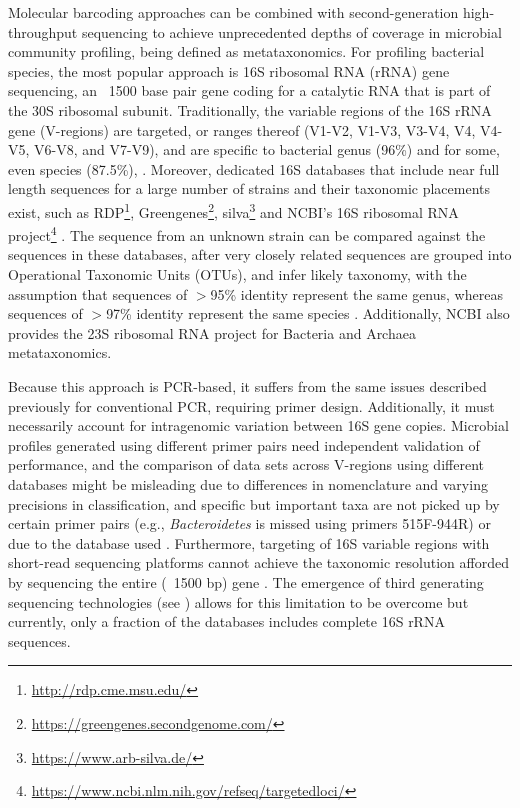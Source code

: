 Molecular barcoding approaches can be combined with second-generation high-throughput sequencing to achieve unprecedented depths of coverage in microbial community profiling, being defined as metataxonomics. For profiling bacterial species, the most popular approach is 16S ribosomal RNA (rRNA) gene sequencing, an ~1500 base pair gene coding for a catalytic RNA that is part of the 30S ribosomal subunit. Traditionally, the variable regions of the 16S rRNA gene (V-regions) are targeted, or ranges thereof (V1-V2, V1-V3, V3-V4, V4, V4-V5, V6-V8, and V7-V9), and are specific to bacterial genus (96\%) and for some, even species (87.5\%), \citep{srinivasan_use_2015, abellan-schneyder_primer_2021}. Moreover, dedicated 16S databases that include near full length sequences for a large number of strains and their taxonomic placements exist, such as RDP\footnote{\url{http://rdp.cme.msu.edu/}}, Greengenes\footnote{\url{https://greengenes.secondgenome.com/}}, silva\footnote{\url{https://www.arb-silva.de/}} and NCBI's 16S ribosomal RNA project\footnote{\url{https://www.ncbi.nlm.nih.gov/refseq/targetedloci/}} \citep{cole_ribosomal_2009, desantis_greengenes_2006, pruesse_silva_2007}. The sequence from an unknown strain can be compared against the sequences in these databases, after very closely related sequences are grouped into Operational Taxonomic Units (OTUs), and infer likely taxonomy, with the assumption that sequences of $>$95\% identity represent the same genus, whereas sequences of $>$97\% identity represent the same species \citep{schloss_introducing_2005}. Additionally, NCBI also provides the 23S ribosomal RNA project for Bacteria and Archaea metataxonomics. 

Because this approach is PCR-based, it suffers from the same issues described previously for conventional PCR, requiring primer design. Additionally, it must necessarily account for intragenomic variation between 16S gene copies. Microbial profiles generated using different primer pairs need independent validation of performance, and the comparison of data sets across V-regions using different databases might be misleading due to differences in nomenclature and varying precisions in classification, and specific but important taxa are not picked up by certain primer pairs (e.g., \textit{Bacteroidetes} is missed using primers 515F-944R) or due to the database used \citep{abellan-schneyder_primer_2021}. Furthermore, targeting of 16S variable regions with short-read sequencing platforms cannot achieve the taxonomic resolution afforded by sequencing the entire (~1500 bp) gene \citep{johnson_evaluation_2019}. The emergence of third generating sequencing technologies (see ) allows for this limitation to be overcome but currently,  only a fraction of the databases includes complete 16S rRNA sequences.

